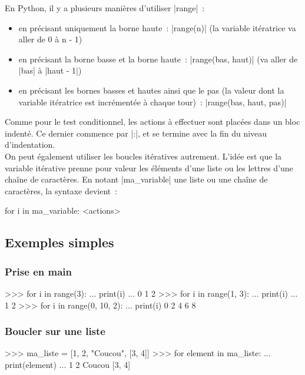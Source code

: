 		En Python, il y a plusieurs manières d'utiliser \python|range|~:
		\begin{itemize}
			\item en précisant uniquement la borne haute~: \python|range(n)| (la variable itératrice va aller de 0 à n - 1)
			\item en précisant la borne basse et la borne haute~: \python|range(bas, haut)| (va aller de \python|bas| à \python|haut - 1|)
			\item en précisant les bornes basses et hautes ainsi que le pas (la valeur dont la variable itératrice est incrémentée à chaque tour)~: \python|range(bas, haut, pas)|
		\end{itemize}
		
		Comme pour le test conditionnel, les actions à effectuer sont placées dans un bloc indenté. Ce dernier commence par \python|:|, et se termine avec la fin du niveau d'indentation. \\
		
		On peut également utiliser les boucles itératives autrement. L'idée est que la variable itérative prenne pour valeur les éléments d'une liste ou les lettres d'une chaîne de caractères. En notant \python|ma_variable| une liste ou une chaîne de caractères, la syntaxe devient~:
		\begin{pythoncode}
			for i in ma_variable:
				<actions>
		\end{pythoncode} 
		
	\subsection{Exemples simples}
	
		\subsubsection{Prise en main}
		\begin{pythoncode}
			>>> for i in range(3):
			...     print(i)
			...
			0
			1
			2
			>>> for i in range(1, 3):
			...     print(i)
			...
			1
			2
			>>> for i in range(0, 10, 2):
			...     print(i)
			0
			2
			4
			6
			8
		\end{pythoncode}

		\subsubsection{Boucler sur une liste}
		\begin{pythoncode}
			>>> ma_liste = [1, 2, "Coucou", [3, 4]]
			>>> for element in ma_liste:
			...     print(element)
			...
			1
			2
			Coucou
			[3, 4]
		\end{pythoncode}
		
